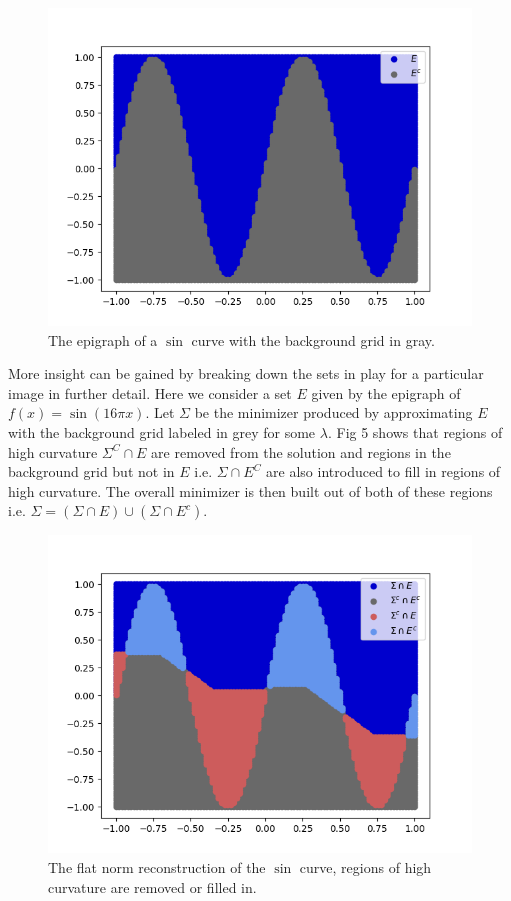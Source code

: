 \documentclass[12pt]{article}
\begin{document}
\begin{figure}[H]
	\centering
	\includegraphics[scale=0.6]{figures/epigraph.png}
	\caption{The epigraph of a $\sin$ curve with the background grid in gray.}
\end{figure}

More insight can be gained by breaking down the sets in play for a particular image in further detail. Here we consider a set $E$ given by the epigraph of $f(x) = \sin(16\pi x)$. Let $\Sigma$ be the minimizer produced by approximating $E$ with the background grid labeled in grey for some $\lambda$. Fig 5 shows that regions of high curvature $\Sigma^C \cap E$ are removed from the solution and regions in the background grid but not in $E$ i.e. $\Sigma \cap E^C$ are also introduced to fill in regions of high curvature. The overall minimizer is then built out of both of these regions i.e. $\Sigma = (\Sigma \cap E) \cup (\Sigma \cap E^c)$.

\begin{figure}[H]
	\centering
	\includegraphics[scale=0.6]{figures/minimizer_detail.png}
	\caption{The flat norm reconstruction of the $\sin$ curve, regions of high curvature are removed or filled in.}
\end{figure}
\end{document}
